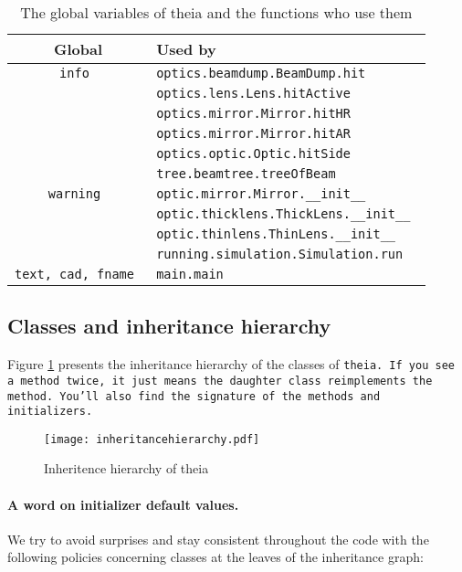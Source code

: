 \documentclass{article}
\begin{document}
\begin{table}[h]
\begin{center}

\begin{tabular}{|c | l |}
\hline
\textbf{Global} & \textbf{Used by} \\ \hline \hline

\tt{info} & \tt{optics.beamdump.BeamDump.hit} \\
& \tt{optics.lens.Lens.hitActive} \\
& \tt{optics.mirror.Mirror.hitHR} \\
& \tt{optics.mirror.Mirror.hitAR} \\
& \tt{optics.optic.Optic.hitSide} \\
& \tt{tree.beamtree.treeOfBeam} \\ \hline

\tt{warning} & \tt{optic.mirror.Mirror.\_\_init\_\_} \\
& \tt{optic.thicklens.ThickLens.\_\_init\_\_} \\
& \tt{optic.thinlens.ThinLens.\_\_init\_\_} \\
& \tt{running.simulation.Simulation.run} \\ \hline

\tt{text, cad, fname} & \tt{main.main} \\ \hline

\end{tabular}
\caption{The global variables of theia and the functions who use them}
\label{globals}
\end{center}
\end{table}
\subsection{Classes and inheritance hierarchy}
Figure \ref{inheritancehierarchy} presents the inheritance hierarchy of the classes of \tt{theia}. If you see a method twice, it just means the daughter class reimplements the method. You'll also find the signature of the methods and  initializers.

\begin{figure}[h]
\begin{center}
\texttt{[image: inheritancehierarchy.pdf]}
\caption{Inheritence hierarchy of theia}
\label{inheritancehierarchy}
\end{center}
\end{figure}
\paragraph{A word on initializer default values.}We try to avoid surprises and stay consistent throughout the code with the following policies concerning classes at the leaves of the inheritance graph:
\end{document}
